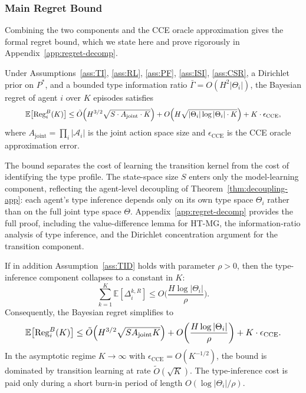 \subsubsection{Main Regret Bound}

Combining the two components and the CCE oracle approximation gives the formal regret bound, which we state here and prove rigorously in Appendix~\ref{app:regret-decomp}.

\begin{theorem}
\label{thm:main-regret-app}
Under Assumptions~\ref{ass:TI}, \ref{ass:RL}, \ref{ass:PF}, \ref{ass:ISI}, \ref{ass:CSR}, a Dirichlet prior on $P^*$, and a bounded type information ratio $\bar{\Gamma} = O(H^2 |\Theta_i|)$, the Bayesian regret of agent $i$ over $K$ episodes satisfies
\begin{equation}\label{eq:main-regret-sketch}\resizebox{0.9\linewidth}{!}{$\displaystyle \mathbb{E}\big[\mathrm{Reg}_i^B(K)\big] \leq \tilde{O}\Big(H^{3/2}\sqrt{S \cdot A_{\mathrm{joint}} \cdot K}\Big) + O\Big(H \sqrt{|\Theta_i| \log|\Theta_i| \cdot K}\Big) + K \cdot \epsilon_{\mathrm{CCE}}, $}\end{equation}
where $A_{\mathrm{joint}} = \prod_i |\mathcal{A}_i|$ is the joint action space size and $\epsilon_{\mathrm{CCE}}$ is the CCE oracle approximation error.
\end{theorem}

The bound separates the cost of learning the transition kernel from the cost of identifying the type profile. The state-space size $S$ enters only the model-learning component, reflecting the agent-level decoupling of Theorem~\ref{thm:decoupling-app}: each agent's type inference depends only on its own type space $\Theta_i$ rather than on the full joint type space $\Theta$. Appendix~\ref{app:regret-decomp} provides the full proof, including the value-difference lemma for HT-MG, the information-ratio analysis of type inference, and the Dirichlet concentration argument for the transition component.

\begin{corollary}
\label{cor:gap-dependent}
If in addition Assumption~\ref{ass:TID} holds with parameter $\rho > 0$, then the type-inference component collapses to a constant in $K$:
\begin{equation}
\sum_{k=1}^K \mathbb{E}[\Delta_i^{k,R}] \leq O\bigg(\frac{H \log|\Theta_i|}{\rho}\bigg).
\end{equation}
Consequently, the Bayesian regret simplifies to
\begin{equation}\resizebox{0.9\linewidth}{!}{$\displaystyle \mathbb{E}\big[\mathrm{Reg}_i^B(K)\big] \leq \tilde{O}\Big(H^{3/2}\sqrt{S A_{\mathrm{joint}} K}\Big) + O\bigg(\frac{H \log|\Theta_i|}{\rho}\bigg) + K \cdot \epsilon_{\mathrm{CCE}}. $}\end{equation}
In the asymptotic regime $K \to \infty$ with $\epsilon_{\mathrm{CCE}} = O(K^{-1/2})$, the bound is dominated by transition learning at rate $\tilde{O}(\sqrt{K})$. The type-inference cost is paid only during a short burn-in period of length $O(\log|\Theta_i| / \rho)$.
\end{corollary}

